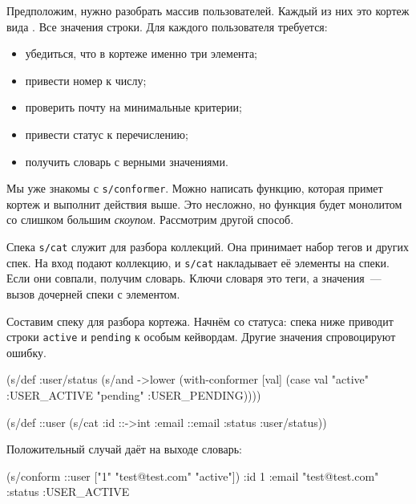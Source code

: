 Предположим, нужно разобрать массив пользователей. Каждый из них это кортеж вида
. Все значения строки. Для каждого пользователя
требуется:

\begin{itemize}

\item
  убедиться, что в кортеже именно три элемента;

\item
  привести номер к числу;

\item
  проверить почту на минимальные критерии;

\item
  привести статус к перечислению;

\item
  получить словарь с верными значениями.

\end{itemize}

Мы уже знакомы с \verb|s/conformer|. Можно написать функцию, которая примет
кортеж и выполнит действия выше. Это несложно, но функция будет монолитом со
слишком большим \emph{скоупом}. Рассмотрим другой способ.


Спека \verb|s/cat| служит для разбора коллекций. Она принимает набор тегов и
других спек. На вход подают коллекцию, и \verb|s/cat| накладывает её элементы на
спеки. Если они совпали, получим словарь. Ключи словаря это теги, а значения~---
вызов дочерней спеки с элементом.

Составим спеку для разбора кортежа. Начнём со статуса: спека ниже приводит
строки \verb|active| и \verb|pending| к особым кейвордам. Другие значения
спровоцируют ошибку.

\begin{english}
  \begin{clojure}
(s/def :user/status
  (s/and ->lower
         (with-conformer [val]
           (case val
             "active"  :USER_ACTIVE
             "pending" :USER_PENDING))))

(s/def ::user
  (s/cat :id ::->int
         :email ::email
         :status :user/status))
  \end{clojure}
\end{english}

\noindent
Положительный случай даёт на выходе словарь:

\begin{english}
  \begin{clojure}
(s/conform ::user ["1" "test@test.com" "active"])
{:id 1
 :email "test@test.com"
 :status :USER_ACTIVE}
  \end{clojure}
\end{english}

